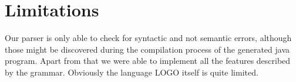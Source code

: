 \section{Limitations}
\label{sec:limitations}
Our parser is only able to check for syntactic and not semantic errors, although those might be discovered during the compilation process of the generated java program. Apart from that we were able to implement all the features described by the grammar. Obviously the language LOGO itself is quite limited.